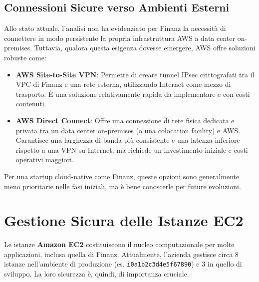 \subsection{Connessioni Sicure verso Ambienti Esterni}
\label{subsec:vpn-directconnect_cap2}
Allo stato attuale, l'analisi non ha evidenziato per Finanz la necessità di connettere in modo persistente la propria infrastruttura AWS a data center on-premises. Tuttavia, qualora questa esigenza dovesse emergere, AWS offre soluzioni robuste come:
\begin{itemize}
    \item \textbf{AWS Site-to-Site VPN}: Permette di creare tunnel IPsec crittografati tra il VPC di Finanz e una rete esterna, utilizzando Internet come mezzo di trasporto. È una soluzione relativamente rapida da implementare e con costi contenuti.
    \item \textbf{AWS Direct Connect}: Offre una connessione di rete fisica dedicata e privata tra un data center on-premises (o una colocation facility) e AWS. Garantisce una larghezza di banda più consistente e una latenza inferiore rispetto a una VPN su Internet, ma richiede un investimento iniziale e costi operativi maggiori.
\end{itemize}
Per una startup cloud-native come Finanz, queste opzioni sono generalmente meno prioritarie nelle fasi iniziali, ma è bene conoscerle per future evoluzioni.

\section{Gestione Sicura delle Istanze EC2}
\label{sec:ec2-security_cap2}
Le istanze \textbf{Amazon EC2} costituiscono il nucleo computazionale per molte applicazioni, inclusa quella di Finanz. Attualmente, l'azienda gestisce circa 8 istanze nell'ambiente di produzione (es. \texttt{i\discretionary{-}{}{-}0a1b2c3d4e5f67890}) e 3 in quello di sviluppo. La loro sicurezza è, quindi, di importanza cruciale.

